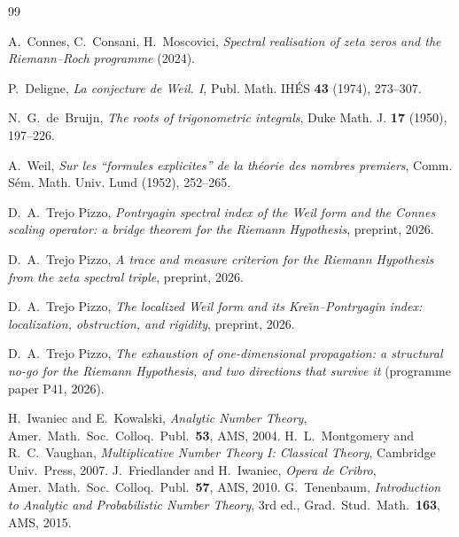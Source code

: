 \documentclass[11pt]{amsart}
\theoremstyle{definition}
\theoremstyle{remark}
\begin{document}
\begin{thebibliography}{99}

 A.~Connes, C.~Consani, H.~Moscovici,
\emph{Spectral realisation of zeta zeros and the Riemann--Roch programme}
(2024).

 P.~Deligne, \emph{La conjecture de Weil. I},
Publ. Math. IH\'ES \textbf{43} (1974), 273--307.

 N.~G.~de~Bruijn, \emph{The roots of trigonometric
integrals}, Duke Math. J. \textbf{17} (1950), 197--226.

 A.~Weil, \emph{Sur les ``formules explicites'' de la
th\'eorie des nombres premiers}, Comm. S\'em. Math. Univ. Lund (1952),
252--265.

 D.~A.~Trejo Pizzo, \emph{Pontryagin spectral index of the Weil form and the Connes scaling operator: a bridge theorem for the Riemann Hypothesis}, preprint, 2026.

 D.~A.~Trejo Pizzo, \emph{A trace and measure criterion for the Riemann Hypothesis from the zeta spectral triple}, preprint, 2026.

 D.~A.~Trejo Pizzo, \emph{The localized Weil form and its Kre\u\i n--Pontryagin index: localization, obstruction, and rigidity}, preprint, 2026.

 D.~A.~Trejo Pizzo, \emph{The exhaustion of one-dimensional
propagation: a structural no-go for the Riemann Hypothesis, and two
directions that survive it} (programme paper P41, 2026).

 H.~Iwaniec and E.~Kowalski, \emph{Analytic Number Theory}, Amer.\ Math.\ Soc.\ Colloq.\ Publ.\ \textbf{53}, AMS, 2004.
 H.~L.~Montgomery and R.~C.~Vaughan, \emph{Multiplicative Number Theory I: Classical Theory}, Cambridge Univ.\ Press, 2007.
 J.~Friedlander and H.~Iwaniec, \emph{Opera de Cribro}, Amer.\ Math.\ Soc.\ Colloq.\ Publ.\ \textbf{57}, AMS, 2010.
 G.~Tenenbaum, \emph{Introduction to Analytic and Probabilistic Number Theory}, 3rd ed., Grad.\ Stud.\ Math.\ \textbf{163}, AMS, 2015.
\end{thebibliography}
\end{document}
